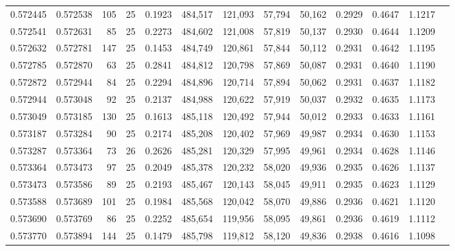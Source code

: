 \begin{tabular}{rrrrrrrrrrrrr}
0.572445 & 0.572538 &   105 &  25 &                                     0.1923 & 484,517 & 121,093 &  57,794 &  50,162 & 0.2929 & 0.4647 & 1.1217 \\
0.572541 & 0.572631 &    85 &  25 &                                     0.2273 & 484,602 & 121,008 &  57,819 &  50,137 & 0.2930 & 0.4644 & 1.1209 \\
0.572632 & 0.572781 &   147 &  25 &                                     0.1453 & 484,749 & 120,861 &  57,844 &  50,112 & 0.2931 & 0.4642 & 1.1195 \\
0.572785 & 0.572870 &    63 &  25 &                                     0.2841 & 484,812 & 120,798 &  57,869 &  50,087 & 0.2931 & 0.4640 & 1.1190 \\
0.572872 & 0.572944 &    84 &  25 &                                     0.2294 & 484,896 & 120,714 &  57,894 &  50,062 & 0.2931 & 0.4637 & 1.1182 \\
0.572944 & 0.573048 &    92 &  25 &                                     0.2137 & 484,988 & 120,622 &  57,919 &  50,037 & 0.2932 & 0.4635 & 1.1173 \\
0.573049 & 0.573185 &   130 &  25 &                                     0.1613 & 485,118 & 120,492 &  57,944 &  50,012 & 0.2933 & 0.4633 & 1.1161 \\
0.573187 & 0.573284 &    90 &  25 &                                     0.2174 & 485,208 & 120,402 &  57,969 &  49,987 & 0.2934 & 0.4630 & 1.1153 \\
0.573287 & 0.573364 &    73 &  26 &                                     0.2626 & 485,281 & 120,329 &  57,995 &  49,961 & 0.2934 & 0.4628 & 1.1146 \\
0.573364 & 0.573473 &    97 &  25 &                                     0.2049 & 485,378 & 120,232 &  58,020 &  49,936 & 0.2935 & 0.4626 & 1.1137 \\
0.573473 & 0.573586 &    89 &  25 &                                     0.2193 & 485,467 & 120,143 &  58,045 &  49,911 & 0.2935 & 0.4623 & 1.1129 \\
0.573588 & 0.573689 &   101 &  25 &                                     0.1984 & 485,568 & 120,042 &  58,070 &  49,886 & 0.2936 & 0.4621 & 1.1120 \\
0.573690 & 0.573769 &    86 &  25 &                                     0.2252 & 485,654 & 119,956 &  58,095 &  49,861 & 0.2936 & 0.4619 & 1.1112 \\
0.573770 & 0.573894 &   144 &  25 &                                     0.1479 & 485,798 & 119,812 &  58,120 &  49,836 & 0.2938 & 0.4616 & 1.1098 \\

\end{tabular}
